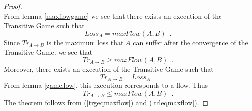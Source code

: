 \documentclass[11pt]{llncs}
\theoremstyle{definition}
\begin{document}
    \begin{proof} \ \\
       From lemma \ref{maxflowgame} we see that there exists an execution of the Transitive Game such that
       \begin{equation}
          Loss_A = maxFlow\left(A, B\right) \enspace.
       \end{equation}
       Since $Tr_{A \rightarrow B}$ is the maximum loss that $A$ can suffer after the convergence of the Transitive Game, we
       see that
       \begin{equation}
       \label{trgeqmaxflow}
          Tr_{A \rightarrow B} \geq maxFlow\left(A, B\right) \enspace.
       \end{equation}
       Moreover, there exists an execution of the Transitive Game such that
       \begin{equation}
          Tr_{A \rightarrow B} = Loss_A \enspace.
       \end{equation}
       From lemma \ref{gameflow}, this execution corresponds to a flow. Thus
       \begin{equation}
       \label{trleqmaxflow}
          Tr_{A \rightarrow B} \leq maxFlow\left(A, B\right) \enspace.
       \end{equation}
       The theorem follows from (\ref{trgeqmaxflow}) and (\ref{trleqmaxflow}).
    \end{proof}
\end{document}
